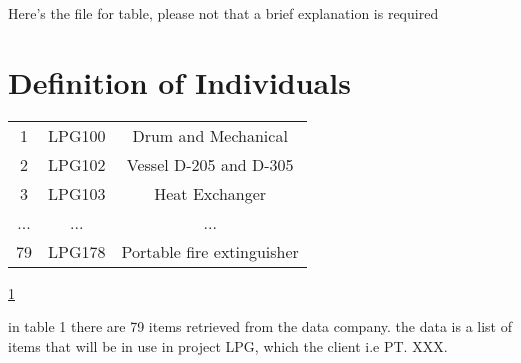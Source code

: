 Here's the file for table, please not that a brief explanation is required

\section{Definition of Individuals} \label{table}
\begin{table}[h]
    \centering
    \begin{tabular}{c c c}
    \hline
    1 & LPG100 & Drum and Mechanical \\
    2 & LPG102 & Vessel D-205 and D-305 \\
    3 & LPG103 & Heat Exchanger \\
    ... & ... & ... \\
    79 & LPG178 & Portable fire extinguisher \\
    \hline
    \end{tabular}
    \ref{table}
\end{table}

\par in table 1 there are 79 items retrieved from the data company. the data is a list of items that will be in use in project LPG, which the client i.e PT. XXX. 